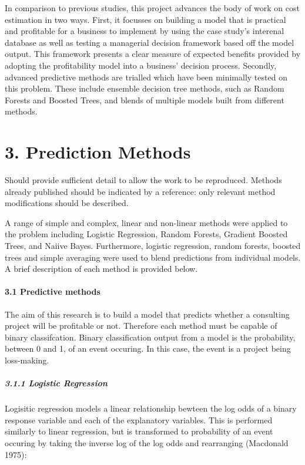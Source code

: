 \documentclass[]{elsarticle} %
\begin{document}
In comparison to previous studies, this project advances the body of
work on cost estimation in two ways. First, it focusses on building a
model that is practical and profitable for a business to implement by
using the case study's interenal database as well as testing a
managerial decision framework based off the model output. This framework
presents a clear measure of expected benefits provided by adopting the
profitability model into a business' decision process. Secondly,
advanced predictive methods are trialled which have been minimally
tested on this problem. These include ensemble decision tree methods,
such as Random Forests and Boosted Trees, and blends of multiple models
built from different methods.

\section{3. Prediction Methods}\label{prediction-methods}

Should provide sufficient detail to allow the work to be reproduced.
Methods already published should be indicated by a reference: only
relevant method modifications should be described.

A range of simple and complex, linear and non-linear methods were
applied to the problem including Logistic Regression, Random Forests,
Gradient Boosted Trees, and Naiive Bayes. Furthermore, logistic
regression, random forests, boosted trees and simple averaging were used
to blend predictions from individual models. A brief description of each
method is provided below.

\paragraph{3.1 Predictive methods}\label{predictive-methods}

The aim of this research is to build a model that predicts whether a
consulting project will be profitable or not. Therefore each method must
be capable of binary classifcation. Binary classification output from a
model is the probability, between 0 and 1, of an event occuring. In this
case, the event is a project being loss-making.

\subparagraph{3.1.1 Logistic Regression}\label{logistic-regression}

Logisitic regression models a linear relationship bewteen the log odds
of a binary response variable and each of the explanatory variables.
This is performed similarly to linear regression, but is transformed to
probability of an event occuring by taking the inverse log of the log
odds and rearranging (Macdonald 1975):
\end{document}
